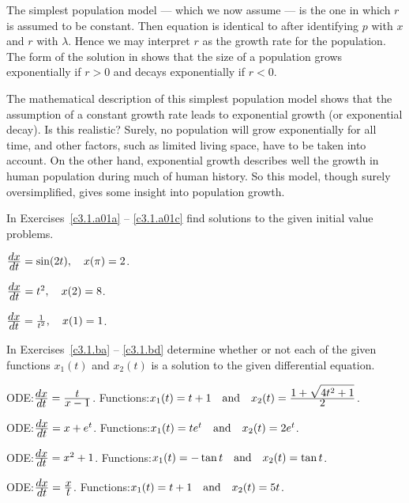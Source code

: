 The simplest population model --- which
we now assume --- is the
one in which $r$ is assumed to be constant.  Then equation
 is identical to  after identifying $p$
with $x$ and $r$ with $\lambda$.  Hence we may interpret $r$ as
the growth rate for the population.  The form of the solution in
 shows that the size of a population grows
exponentially if $r>0$ and decays exponentially if $r<0$.

The mathematical description of this simplest population model
shows that the assumption of a constant growth rate leads to
exponential growth (or exponential decay).  Is this realistic?
Surely, no population will grow exponentially for all time, and
other factors, such as limited living space, have to be taken
into account.  On the other hand, exponential growth describes
well the growth in human population during much of human
history.  So this model, though surely oversimplified, gives
some insight into population growth.

\EXER

\TEXER


\noindent In Exercises~\ref{c3.1.a01a} -- \ref{c3.1.a01c} find
solutions to the given initial value problems.
\begin{exercise} \label{c3.1.a01a}
$\frac{\displaystyle dx}{\displaystyle dt} = \sin(2t),\quad x(\pi) = 2$.
\end{exercise}
\begin{exercise} \label{c3.1.a01b}
$\frac{\displaystyle dx}{\displaystyle dt} = t^2, \quad x(2) = 8$.
\end{exercise}
\begin{exercise} \label{c3.1.a01c}
$\frac{\displaystyle dx}{\displaystyle dt} = \frac{1}{t^2},\quad x(1)=1$.
\end{exercise}

\noindent In Exercises~\ref{c3.1.ba} -- \ref{c3.1.bd} determine whether
or not each of the given functions $x_1(t)$ and $x_2(t)$ is a solution 
to the given differential equation.
\begin{exercise}  \label{c3.1.ba}
ODE:\quad $\frac{\displaystyle dx}{\displaystyle dt} = \frac{\displaystyle t}{\displaystyle x-1}$.
Functions:\quad $x_1(t)=t+1 \quad\mbox{and}\quad x_2(t)= \frac{\displaystyle 1+\sqrt{4t^2+1}}{\displaystyle 2}$.
\end{exercise}
\begin{exercise}  \label{c3.1.bb}
ODE:\quad $\frac{\displaystyle dx}{\displaystyle dt} = x + e^t$.
Functions:\quad $x_1(t)=te^t \quad\mbox{and}\quad x_2(t)= 2e^t$.
\end{exercise}
\begin{exercise}  \label{c3.1.bc}
ODE:\quad $\frac{\displaystyle dx}{\displaystyle dt} = x^2 + 1$.
Functions:\quad $x_1(t)=-\tan t \quad\mbox{and}\quad x_2(t)= \tan t$.
\end{exercise}
\begin{exercise}  \label{c3.1.bd}
ODE:\quad $\frac{\displaystyle dx}{\displaystyle dt} = \frac{\displaystyle x}{\displaystyle t}$.
Functions:\quad $x_1(t)=t+1 \quad\mbox{and}\quad x_2(t)= 5t$.
\end{exercise}


